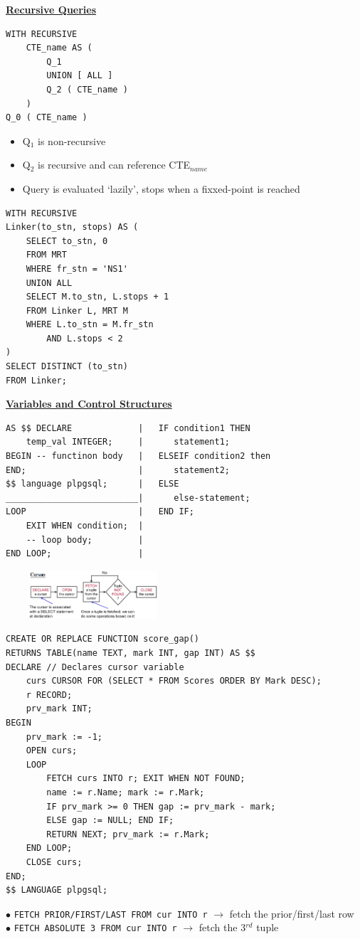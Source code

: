 \documentclass[10pt,landscape]{article}
\begin{document}
\begin{multicols*}{3}
\begin{multicols*}{2}
\textbf{\underline{Recursive Queries}}
\begin{lstlisting}
WITH RECURSIVE
    CTE_name AS (
        Q_1
        UNION [ ALL ]
        Q_2 ( CTE_name )
    )
Q_0 ( CTE_name )
\end{lstlisting}
\begin{itemize}[topsep=0pt,noitemsep,wide=0pt, leftmargin=\dimexpr{} + 2\relax]
    \item Q$_1$ is non-recursive
    \item Q$_2$ is recursive and can reference CTE$_{name}$
    \item Query is evaluated `lazily', stops when a fixxed-point is reached
\end{itemize} \break
\begin{lstlisting}
WITH RECURSIVE
Linker(to_stn, stops) AS (
    SELECT to_stn, 0
    FROM MRT
    WHERE fr_stn = 'NS1'
    UNION ALL
    SELECT M.to_stn, L.stops + 1
    FROM Linker L, MRT M
    WHERE L.to_stn = M.fr_stn
        AND L.stops < 2
)
SELECT DISTINCT (to_stn)
FROM Linker;
\end{lstlisting}
\end{multicols*}

\textbf{\underline{Variables and Control Structures}}
\begin{lstlisting}
AS $$ DECLARE             |   IF condition1 THEN
    temp_val INTEGER;     |      statement1;
BEGIN -- functinon body   |   ELSEIF condition2 then
END;                      |      statement2;
$$ language plpgsql;      |   ELSE
__________________________|      else-statement;
LOOP                      |   END IF;
    EXIT WHEN condition;  |
    -- loop body;         |
END LOOP;                 |
\end{lstlisting}
\includegraphics[width=6.5cm, height=1.8cm]{images/cursorworkflow.png}
\begin{lstlisting}
CREATE OR REPLACE FUNCTION score_gap()
RETURNS TABLE(name TEXT, mark INT, gap INT) AS $$
DECLARE // Declares cursor variable
    curs CURSOR FOR (SELECT * FROM Scores ORDER BY Mark DESC);
    r RECORD;
    prv_mark INT;
BEGIN
    prv_mark := -1;
    OPEN curs;   
    LOOP     
        FETCH curs INTO r; EXIT WHEN NOT FOUND; 
        name := r.Name; mark := r.Mark;
        IF prv_mark >= 0 THEN gap := prv_mark - mark;
        ELSE gap := NULL; END IF;
        RETURN NEXT; prv_mark := r.Mark;   
    END LOOP;
    CLOSE curs;               
END;
$$ LANGUAGE plpgsql;
\end{lstlisting}
$\bullet$ \verb|FETCH PRIOR/FIRST/LAST FROM cur INTO r| $\rightarrow$ fetch the prior/first/last row \\
$\bullet$ \verb|FETCH ABSOLUTE 3 FROM cur INTO r| $\rightarrow$ fetch the 3$^{rd}$ tuple


\end{multicols*}
\end{document}
